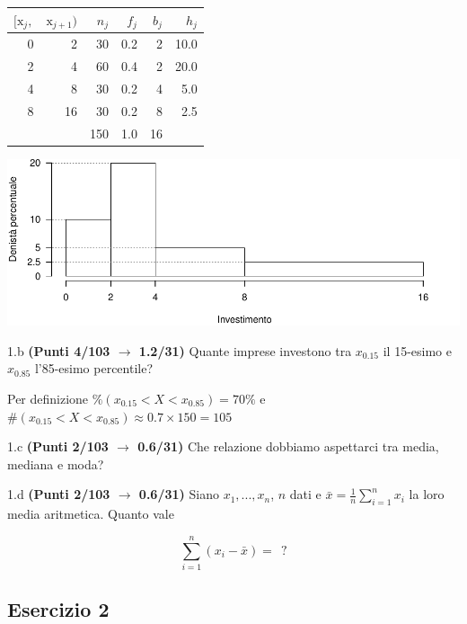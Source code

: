 \documentclass[
  11pt,
]{book}
\theoremstyle{mytheoremstyle}
\theoremstyle{mydefstyle}
\newenvironment{sol}
  {
  \begin{tcolorbox}[enhanced,breakable,arc=0.1mm,boxrule=1pt,colback=white,colframe=iblue,
  title=\bf \fontfamily{lmss}\selectfont \hspace{.5 cm} Soluzione,drop fuzzy shadow]

}{
\end{tcolorbox}
  }
\begin{document}
\begin{sol}

\begin{table}[H]
\centering
\begin{tabular}{rrrrrr}
\toprule
$[\text{x}_j,$ & $\text{x}_{j+1})$ & $n_j$ & $f_j$ & $b_j$ & $h_j$\\
\midrule
0 & 2 & 30 & 0.2 & 2 & 10.0\\
2 & 4 & 60 & 0.4 & 2 & 20.0\\
4 & 8 & 30 & 0.2 & 4 & 5.0\\
8 & 16 & 30 & 0.2 & 8 & 2.5\\
 &  & 150 & 1.0 & 16 & \\
\bottomrule
\end{tabular}
\end{table}

\begin{center}\includegraphics{Esami_passati_con_soluzioni_files/figure-latex/2024-106-1} \end{center}

\end{sol}

1.b \textbf{(Punti 4/103 \(\rightarrow\) 1.2/31)} Quante imprese investono tra \(x_{0.15}\) il 15-esimo e \(x_{0.85}\) l'85-esimo percentile?

\begin{sol}
Per definizione \(\%(x_{0.15}<X<x_{0.85})=70\%\) e
\(\#(x_{0.15}<X<x_{0.85})\approx0.7\times150 =105\)

\end{sol}

1.c \textbf{(Punti 2/103 \(\rightarrow\) 0.6/31)} Che relazione dobbiamo aspettarci tra media, mediana e moda?

1.d \textbf{(Punti 2/103 \(\rightarrow\) 0.6/31)} Siano \(x_1,...,x_n\), \(n\) dati e \(\bar x=\frac 1n \sum_{i=1}^n x_i\) la loro media aritmetica. Quanto vale

\[
\sum_{i=1}^n (x_i-\bar x)=~~?
\]

\subsection{Esercizio 2}\label{esercizio-2-40}
\end{document}
